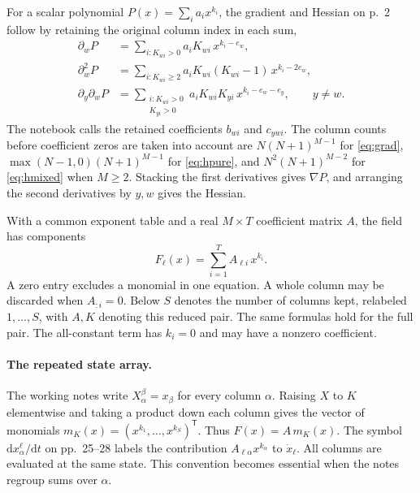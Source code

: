 \documentclass[11pt,letterpaper]{article}
\newcommand{\dd}{\mathrm{d}}
\newcommand{\src}[1]{\par\smallskip\noindent{\small\itshape Notebook, #1.}\par\medskip}
\begin{document}
For a scalar polynomial \(P(x)=\sum_i a_i x^{k_i}\), the gradient and Hessian
on p.~2 follow by retaining the original column index in each sum,
\begin{align}
 \partial_w P
 &=\sum_{i:K_{wi}>0} a_iK_{wi}\,x^{k_i-e_w},\label{eq:grad}\\
 \partial_w^2 P
 &=\sum_{i:K_{wi}\ge2}a_iK_{wi}(K_{wi}-1)\,x^{k_i-2e_w},\label{eq:hpure}\\
 \partial_y\partial_w P
 &=\sum_{\substack{i:K_{wi}>0\\K_{yi}>0}}
    a_iK_{wi}K_{yi}\,x^{k_i-e_w-e_y},\qquad y\ne w .\label{eq:hmixed}
\end{align}
The notebook calls the retained coefficients \(b_{wi}\) and \(c_{ywi}\).
The column counts before coefficient zeros are taken into account are
\(N(N+1)^{M-1}\) for \eqref{eq:grad},
\(\max(N-1,0)(N+1)^{M-1}\) for \eqref{eq:hpure}, and
\(N^2(N+1)^{M-2}\) for \eqref{eq:hmixed} when \(M\ge2\).
Stacking the first derivatives gives \(\nabla P\), and arranging the second
derivatives by \(y,w\) gives the Hessian.

With a common exponent table and a real \(M\times T\) coefficient matrix \(A\), the field has components
\begin{equation}\label{eq:field}
 F_\ell(x)=\sum_{i=1}^{T} A_{\ell i}\,x^{k_i}.
\end{equation}
A zero entry excludes a monomial in one equation. A whole column may be
discarded when \(A_{:i}=0\). Below \(S\) denotes the number of columns kept,
relabeled \(1,\ldots,S\), with \(A,K\) denoting this reduced pair. The same
formulas hold for the full pair. The all-constant term has \(k_i=0\) and may
have a nonzero coefficient.

\paragraph{The repeated state array.}
The working notes write \(X^\beta_\alpha=x_\beta\) for every column
\(\alpha\). Raising \(X\) to \(K\) elementwise and taking a product down each
column gives the vector of monomials \(m_K(x)=(x^{k_1},\ldots,x^{k_S})^\mathsf{T}\).
Thus \(F(x)=A\,m_K(x)\). The symbol \(\dd x^\ell_\alpha/\dd t\) on pp.~25--28
labels the contribution \(A_{\ell\alpha}x^{k_\alpha}\) to \(\dot x_\ell\).
All columns are evaluated at the same state. This convention becomes essential
when the notes regroup sums over \(\alpha\).
\src{pp.~2--4, 10--11, 25--29, 39, 45--46}
\end{document}
